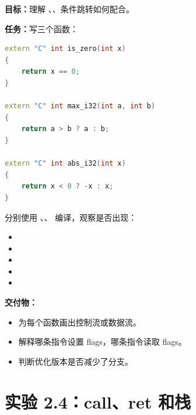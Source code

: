 \begin{labbox}
\textbf{目标：}理解 、、条件跳转如何配合。

\textbf{任务：}写三个函数：

\begin{lstlisting}[language=C++]
extern "C" int is_zero(int x)
{
    return x == 0;
}

extern "C" int max_i32(int a, int b)
{
    return a > b ? a : b;
}

extern "C" int abs_i32(int x)
{
    return x < 0 ? -x : x;
}
\end{lstlisting}

分别使用 、、 编译，观察是否出现：

\begin{itemize}
  \item {}
  \item {}
  \item {}
  \item {}
  \item {}
\end{itemize}

\textbf{交付物：}

\begin{itemize}
  \item 为每个函数画出控制流或数据流。
  \item 解释哪条指令设置 flags，哪条指令读取 flags。
  \item 判断优化版本是否减少了分支。
\end{itemize}
\end{labbox}

\section{实验 2.4：call、ret 和栈}

